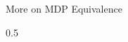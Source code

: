 \documentclass[lecture]{beamer}
\newcommand{\vect}[1]{\ensuremath{\boldsymbol{\mathrm{#1}}}}
\begin{document}
\begin{frame}{\normalsize More on MDP Equivalence}
\begin{overlayarea}{\textwidth}{0.5\textheight}
{\begin{columns}
\end{columns}
}

\end{overlayarea}


\end{frame}
%
%
%
%
\end{document}
